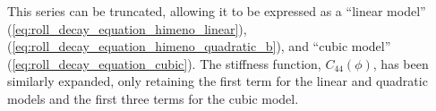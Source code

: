 \noindent This series can be truncated, allowing it to be expressed as a ``linear model'' (\autoref{eq:roll_decay_equation_himeno_linear}),  (\autoref{eq:roll_decay_equation_himeno_quadratic_b}), and ``cubic model'' (\autoref{eq:roll_decay_equation_cubic}). The stiffness function, $C_{44}(\phi)$, has been similarly expanded, only retaining the first term for the linear and quadratic models and the first three terms for the cubic model. 



%